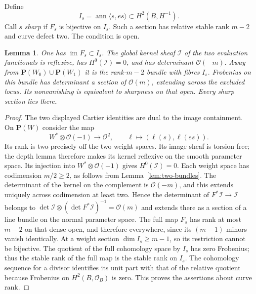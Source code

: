 \documentclass[11pt]{article}
\newtheorem{lemma}[theorem]{Lemma}
\theoremstyle{definition}\newtheorem{definition}[theorem]{Definition}
\theoremstyle{remark}\newtheorem{remark}[theorem]{Remark}
\newcommand{\OO}{\mathcal O}
\begin{document}
Define
\[
 I_s=\operatorname{ann}\langle s,es\rangle\subset H^2(B,H^{-1}).
\]
Call $s$ \emph{sharp} if $F_s$ is bijective on $I_s$. Such a section has relative stable rank $m-2$ and curve defect two. The condition is open.

\begin{lemma}\label{lem:toral-image}
One has $\operatorname{im}F_s\subset I_s$. The global kernel sheaf $\mathcal I$ of the two evaluation functionals is reflexive, has $H^0(\mathcal I)=0$, and has determinant $\OO(-m)$. Away from
$\mathbf P(W_0)\cup\mathbf P(W_1)$ it is the rank-$m-2$ bundle with fibres $I_s$. Frobenius on this bundle has determinant a section of $\OO(m)$, extending across the excluded locus. Its nonvanishing is equivalent to sharpness on that open. Every sharp section lies there.
\end{lemma}
\begin{proof}
The two displayed Cartier identities are dual to the image containment. On $\mathbf P(W)$ consider the map
\[
 W^*\otimes\OO(-1)\longrightarrow\OO^2,\qquad
 \ell\longmapsto(\ell(s),\ell(es)).
\]
Its rank is two precisely off the two weight spaces. Its image sheaf is torsion-free; the depth lemma therefore makes its kernel reflexive on the smooth parameter space. Its injection into $W^*\otimes\OO(-1)$ gives $H^0(\mathcal I)=0$. Each weight space has codimension $m/2\ge2$, as follows from Lemma~\ref{lem:two-bundles}. The determinant of the kernel on the complement is $\OO(-m)$, and this extends uniquely across codimension at least two. Hence the determinant of $F^*\mathcal I\to\mathcal I$ belongs to
$\det\mathcal I\otimes(\det F^*\mathcal I)^{-1}=\OO(m)$ and extends there as a section of a line bundle on the normal parameter space.
The full map $F_s$ has rank at most $m-2$ on that dense open, and therefore everywhere, since its $(m-1)$-minors vanish identically. At a weight section $\dim I_s\ge m-1$, so its restriction cannot be bijective. The quotient of the full cohomology space by $I_s$ has zero Frobenius; thus the stable rank of the full map is the stable rank on $I_s$. The cohomology sequence for a divisor identifies its unit part with that of the relative quotient because Frobenius on $H^2(B,\OO_B)$ is zero. This proves the assertions about curve rank.
\end{proof}
\end{document}
